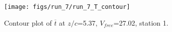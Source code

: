 \begin{figure}[H]
\centering
\texttt{[image: figs/run\_7/run\_7\_T\_contour]}
\caption{Contour plot of $\overline{t}$ at $z/c$=5.37, $V_{free}$=27.02, station 1.}
\label{fig:run_7_T_contour}
\end{figure}


